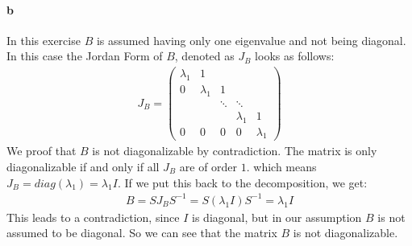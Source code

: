 \paragraph{b}
In this exercise $B$ is assumed having only one eigenvalue and not being diagonal. In this case the Jordan Form of $B$, denoted as $J_B$ looks as follows:
\begin{gather*}
J_B = \left( \begin{array}{ccccc}
\lambda_1 & 1 & & &\\
0 & \lambda_1 & 1 &\\
 &  & \ddots &\ddots\\
& & & \lambda_1 & 1\\ 
0 & 0 & 0 & 0 & \lambda_1
\end{array}\right)
\end{gather*}
We proof that $B$ is not diagonalizable by contradiction.
The matrix is only diagonalizable if and only if all $J_B$ are of order $1$. which means $J_B = diag(\lambda_1) = \lambda_1 I$.
If we put this back to the decomposition, we get:
\begin{gather*}
B = S J_B S^{-1} = S(\lambda_1 I)S^{-1} = \lambda_1 I
\end{gather*}
This leads to a contradiction, since $I$ is diagonal, but in our assumption $B$ is not assumed to be diagonal. So we can see that the matrix $B$ is not diagonalizable.